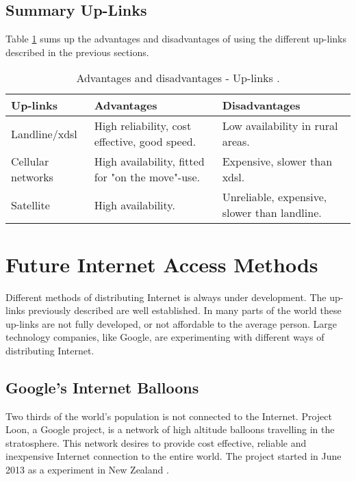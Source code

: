 \subsection{Summary Up-Links}

Table \ref{tab:uplinks} sums up the advantages and disadvantages of using the different up-links described in the previous sections. 

\begin{center}
\begin{table}[!h]
\caption{\label{tab:uplinks}Advantages and disadvantages - Up-links \cite{comparisonuplinks}.}
    \begin{tabular}{ | l | p{4cm} | p{5cm} |}
    \hline
    \textbf{Up-links} & \textbf{Advantages} & \textbf{Disadvantages} \\ 
    \hline
    Landline/x\gls{dsl} & High reliability, cost effective, good speed. & Low availability in rural areas. \\ 
    \hline
     Cellular networks & High availability, fitted for "on the move"-use. & Expensive, slower than x\gls{dsl}.\\
    \hline
    Satellite & High availability.  & Unreliable, expensive, slower than landline.\\ 
    \hline
    \end{tabular}
   \end{table}
\end{center}


\section{Future Internet Access Methods}
Different methods of distributing Internet is always under development. The up-links previously described are well established. In many parts of the world these up-links are not fully developed, or not affordable to the average person. Large technology companies, like Google, are experimenting with different ways of distributing Internet. 

\subsection{Google's Internet Balloons}
Two thirds of the world's population is not connected to the Internet. Project Loon, a Google project, is a network of high altitude balloons travelling in the stratosphere. This network desires to provide cost effective, reliable and inexpensive Internet connection to the entire world. The project started in June 2013 as a experiment in New Zealand \cite{loon}. 

